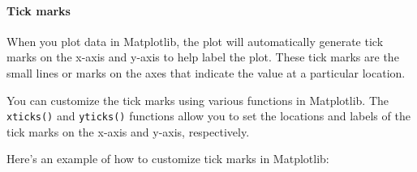 \documentclass[11pt]{article}
\begin{document}
\hypertarget{tick-marks}{%
\paragraph{Tick marks}\label{tick-marks}}

When you plot data in Matplotlib, the plot will automatically generate
tick marks on the x-axis and y-axis to help label the plot. These tick
marks are the small lines or marks on the axes that indicate the value
at a particular location.

You can customize the tick marks using various functions in Matplotlib.
The \texttt{xticks()} and \texttt{yticks()} functions allow you to set
the locations and labels of the tick marks on the x-axis and y-axis,
respectively.

Here's an example of how to customize tick marks in Matplotlib:
\end{document}
